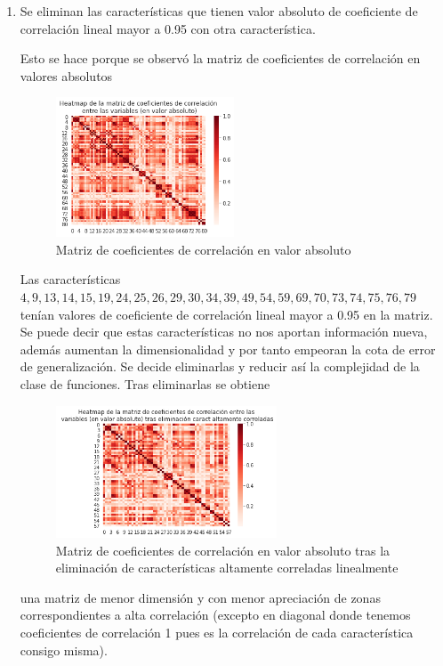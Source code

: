 \documentclass[11pt,a4paper]{article}
\theoremstyle{definition}
\begin{document}
	\begin{enumerate}
		\item Se eliminan las características que tienen valor absoluto de coeficiente de correlación lineal mayor a 0.95 con otra característica. %
		
		Esto se hace porque se observó la matriz de coeficientes de correlación en valores absolutos
		\begin{figure}[H]
		\centering
		\includegraphics[width=0.5\textwidth]{images/corr_matrix_regre}
		\caption{Matriz de coeficientes de correlación en valor absoluto}
		\end{figure}
		Las características $4, 9, 13, 14, 15, 19, 24, 25, 26, 29, 30, 34, 39, 49, 54, 59, 69, 70, 73, 74, 75, 76, 79$ tenían valores de coeficiente de correlación lineal mayor a 0.95 en la matriz. Se puede decir que estas características no nos aportan información nueva, además aumentan la dimensionalidad y por tanto empeoran la cota de error de generalización. Se decide eliminarlas y reducir así la complejidad de la clase de funciones. Tras eliminarlas se obtiene
		\begin{figure}[H]
		\centering
		\includegraphics[width=0.62\textwidth]{images/corr_matrix_post_regre}
		\caption{Matriz de coeficientes de correlación en valor absoluto tras la eliminación de características altamente correladas linealmente}
		\end{figure}
		una matriz de menor dimensión y con menor apreciación de zonas correspondientes a alta correlación (excepto en diagonal donde tenemos coeficientes de correlación 1 pues es la correlación de cada característica consigo misma).

\end{enumerate}
\end{document}
